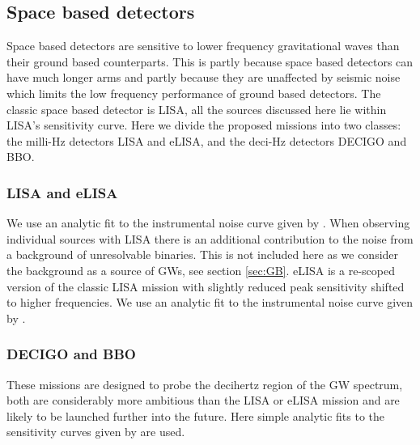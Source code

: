 \documentclass[fleqn,12pt]{iopart}
\begin{document}
\subsection{Space based detectors}
Space based detectors are sensitive to lower frequency gravitational waves than their ground based counterparts. This is partly because space based detectors can have much longer arms and partly because they are unaffected by seismic noise which limits the low frequency performance of ground based detectors. The classic space based detector is LISA, all the sources discussed here lie within LISA's sensitivity curve. Here we divide the proposed missions into two classes: the milli-Hz detectors LISA and eLISA, and the deci-Hz detectors DECIGO and BBO.

\subsubsection{LISA and eLISA}
We use an analytic fit to the instrumental noise curve given by \cite{Sathyaprakash}. When observing individual sources with LISA there is an additional contribution to the noise from a background of unresolvable binaries. This is not included here as we consider the background as a source of GWs, see section \ref{sec:GB}. eLISA is a re-scoped version of the classic LISA mission with slightly reduced peak sensitivity shifted to higher frequencies. We use an analytic fit to the instrumental noise curve given by \cite{DoingScienceWitheLISA}.
\subsubsection{DECIGO and BBO}
These missions are designed to probe the decihertz region of the GW spectrum, both are considerably more ambitious than the LISA or eLISA mission and are likely to be launched further into the future. Here simple analytic fits to the sensitivity curves given by \cite{2011PhRvD..83d4011Y} are used.
\end{document}
